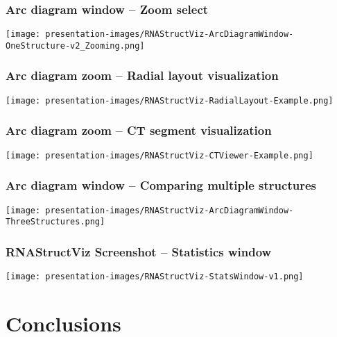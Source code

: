 \documentclass[usenames,svgnames,dvipsnames,11pt]{beamer}
\begin{document}
\begin{frame}[fragile]
\frametitle{Arc diagram window -- Zoom select}

\begin{center}
\texttt{[image: presentation-images/RNAStructViz-ArcDiagramWindow-OneStructure-v2\_Zooming.png]}
\end{center}

\end{frame}

\begin{frame}[fragile]
\frametitle{Arc diagram zoom -- Radial layout visualization}

\begin{center}
\texttt{[image: presentation-images/RNAStructViz-RadialLayout-Example.png]}
\end{center}

\end{frame}

\begin{frame}[fragile]
\frametitle{Arc diagram zoom -- CT segment visualization}

\begin{center}
\texttt{[image: presentation-images/RNAStructViz-CTViewer-Example.png]}
\end{center}

\end{frame}

\begin{frame}[fragile]
\frametitle{Arc diagram window -- Comparing multiple structures}

\begin{center}
\texttt{[image: presentation-images/RNAStructViz-ArcDiagramWindow-ThreeStructures.png]}
\end{center}

\end{frame}

\begin{frame}[fragile]
\frametitle{RNAStructViz Screenshot -- Statistics window}

\begin{center}
\texttt{[image: presentation-images/RNAStructViz-StatsWindow-v1.png]}
\end{center}

\end{frame}

\section{Conclusions}
\end{document}
